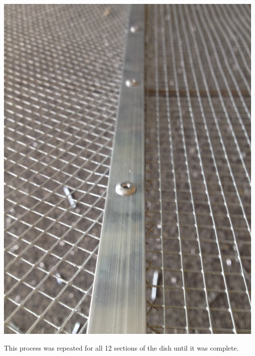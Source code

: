\documentclass[11pt]{article} %
\begin{document}
\begin{center}
\includegraphics[scale=0.12]{dish/15.jpeg}
\end{center}


This process was repeated for all 12 sections of the dish until it was complete.
\end{document}
